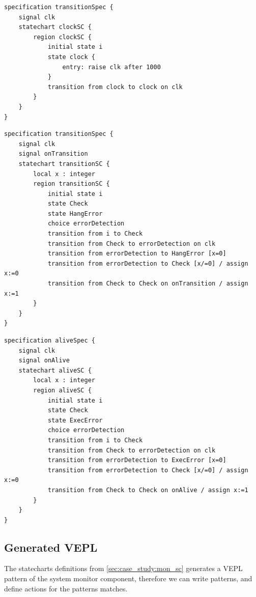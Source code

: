 \begin{lstlisting}[caption={Statechart representation of clock generation},label=lst:case_study:clk_gen]
specification transitionSpec {
    signal clk
    statechart clockSC {
        region clockSC {
            initial state i
            state clock {
                entry: raise clk after 1000
            }
            transition from clock to clock on clk
        }
    }
}
\end{lstlisting}

\newpage
\begin{lstlisting}[caption={Statechart representation of hang error detection},label=lst:case_study:hang_error]
specification transitionSpec {
    signal clk
    signal onTransition
    statechart transitionSC {
        local x : integer
        region transitionSC {
            initial state i
            state Check
            state HangError
            choice errorDetection
            transition from i to Check
            transition from Check to errorDetection on clk
            transition from errorDetection to HangError [x=0]
            transition from errorDetection to Check [x/=0] / assign x:=0
            transition from Check to Check on onTransition / assign x:=1
        }
    }
}
\end{lstlisting}

\begin{lstlisting}[caption={Statechart representation of hang error detection},label=lst:case_study:hang_error]
specification aliveSpec {
    signal clk
    signal onAlive
    statechart aliveSC {
        local x : integer
        region aliveSC {
            initial state i
            state Check
            state ExecError
            choice errorDetection
            transition from i to Check
            transition from Check to errorDetection on clk
            transition from errorDetection to ExecError [x=0]
            transition from errorDetection to Check [x/=0] / assign x:=0
            transition from Check to Check on onAlive / assign x:=1
        }
    }
}
\end{lstlisting}

\newpage
\subsection{Generated VEPL}

The statecharts definitions from \cref{sec:case_study:mon_sc} generates a VEPL pattern of the system monitor component, therefore we can write patterns, and define actions for the patterns matches.


